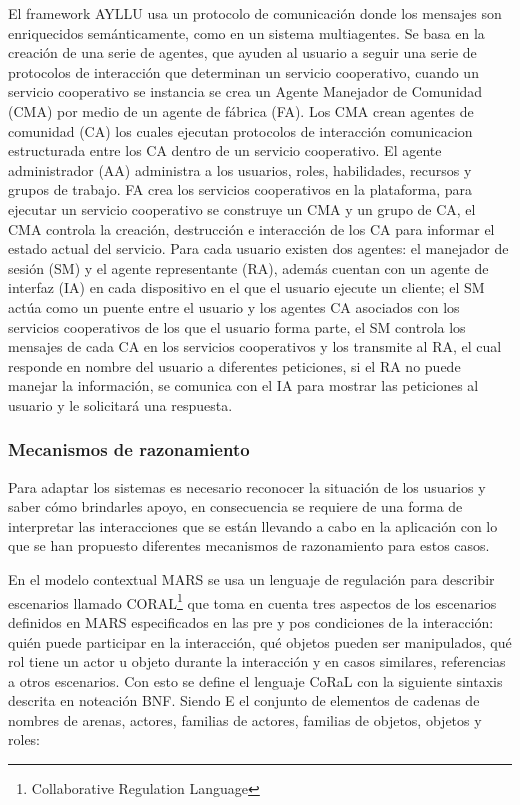 El framework AYLLU \cite{arias2012platform} usa un protocolo de comunicaci\'on donde los mensajes son enriquecidos sem\'anticamente, como en un sistema multiagentes. Se basa en la creaci\'on de una serie de agentes, que ayuden al usuario a seguir una serie de protocolos de interacci\'on que determinan un servicio cooperativo, cuando un servicio cooperativo se instancia se crea un Agente Manejador de Comunidad (CMA) por medio de un agente de f\'abrica (FA). Los CMA crean agentes de comunidad (CA) los cuales ejecutan protocolos de interacci\'on comunicacion estructurada entre los CA dentro de un servicio cooperativo. El agente administrador (AA) administra a los usuarios, roles, habilidades, recursos y grupos de trabajo. FA crea los servicios cooperativos en la plataforma, para ejecutar un servicio cooperativo se construye un CMA y un grupo de CA, el CMA controla la creaci\'on, destrucci\'on e interacci\'on  de los CA para informar el estado actual del servicio. Para cada usuario existen dos agentes: el manejador de sesi\'on (SM) y el agente representante (RA), adem\'as cuentan con un agente de interfaz (IA) en cada dispositivo en el que el usuario ejecute un cliente; el SM act\'ua como un puente entre el usuario y los agentes CA asociados con los servicios cooperativos de los que el usuario forma parte, el SM controla los mensajes de cada CA en los servicios cooperativos y los transmite al RA, el cual responde en nombre del usuario a diferentes peticiones, si el RA no puede manejar la informaci\'on, se comunica con el IA para mostrar las peticiones al usuario y le solicitar\'a una respuesta.

\subsubsection{Mecanismos de razonamiento}

Para adaptar los sistemas es necesario reconocer la situaci\'on de los usuarios y saber c\'omo brindarles apoyo, en consecuencia se requiere de una forma de interpretar las interacciones que se est\'an llevando a cabo en la aplicaci\'on con lo que se han propuesto diferentes mecanismos de razonamiento para estos casos.

En el modelo contextual MARS se usa un lenguaje de regulaci\'on para describir escenarios llamado CORAL\footnote{Collaborative Regulation Language} que toma en cuenta tres aspectos de los escenarios definidos en MARS especificados en las pre y pos condiciones de la interacci\'on: qui\'en puede participar en la interacci\'on, qu\'e objetos pueden ser manipulados, qu\'e rol tiene un actor u objeto durante la interacci\'on y en casos similares, referencias a otros escenarios. Con esto se define el lenguaje CoRaL con la siguiente sintaxis descrita en noteaci\'on BNF. Siendo E el conjunto de elementos de cadenas de nombres de arenas, actores, familias de actores, familias de objetos, objetos y roles:
	

